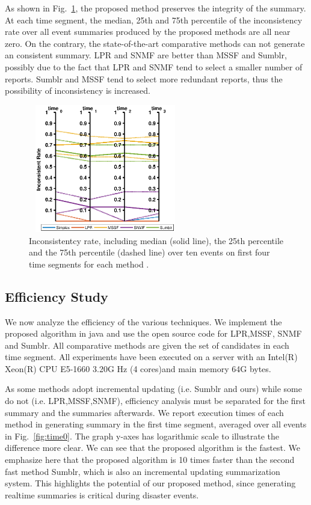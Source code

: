 \documentclass[runningheads]{llncs}
\begin{document}
As shown in Fig.~\ref{fig:conflictRatio}, the proposed method preserves the integrity of the summary. At each time segment, the median, 25th and 75th percentile of the inconsistency rate over all event summaries produced by the proposed methods are all near zero. On the contrary, the state-of-the-art comparative methods can not generate an consistent summary. LPR and SNMF are better than MSSF and Sumblr, possibly due to the fact that LPR and SNMF tend to select a smaller number of reports. Sumblr and MSSF tend to select more redundant reports, thus the possibility of inconsistency is increased.

\vspace{-0.3cm}
\begin{figure}
    \centering
    \includegraphics[width=0.6\textwidth,height=2.2in]{confilct10.eps}
    \setlength{\abovecaptionskip}{-0.1cm}
    \caption{Inconsistentcy rate, including median (solid line), the  25th percentile and the 75th percentile (dashed line) over ten events on first four time segments for each method .}\label{fig:conflictRatio}
\end{figure}

\subsection{Efficiency Study}
We now analyze the efficiency of the various techniques. We implement the proposed algorithm in java and use the open source code for LPR,MSSF, SNMF and Sumblr. All comparative methods are given the set of candidates in each time segment. All experiments have been executed on a server with an Intel(R) Xeon(R) CPU E5-1660 3.20G Hz (4 cores)and main memory 64G bytes.

As some methods adopt incremental updating (i.e. Sumblr and ours) while some do not (i.e. LPR,MSSF,SNMF), efficiency analysis must be separated for the first summary and the summaries afterwards. We report execution times of each method in generating summary in the first time segment, averaged over all events in Fig.~\ref{fig:time0}. The graph y-axes has logarithmic scale to illustrate the difference more clear. We can see that the proposed algorithm is the fastest. We emphasize here that the proposed algorithm is 10 times faster than the second fast method Sumblr, which is also an incremental updating summarization system.  This highlights the potential of our proposed method, since generating realtime summaries is critical during disaster events.
\end{document}
